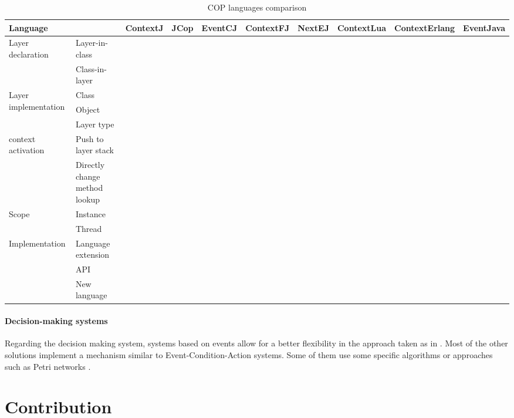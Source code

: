 \documentclass[a4paper]{article}
\begin{document}
\begin{landscape}
  \begin{table}
  \renewcommand{\arraystretch}{1.2}
  \begin{tabular}{l l c c c c c c c c }
  \hline
  \multicolumn{2}{l}{Language} & ContextJ & JCop & EventCJ & ContextFJ & NextEJ & ContextLua & ContextErlang & EventJava \\
  \hline
  \multirow{2}{*}{Layer declaration} & Layer-in-class & & & & & & & \\
    & Class-in-layer & & & & & & & \\
  \hline
  \multirow{3}{*}{Layer implementation} & Class & & & & & & & \\
    & Object & & & & & & & \\
    & Layer type & & & & & & & \\    
  \hline  
  \multirow{2}{*}{context activation} & Push to layer stack& & & & & & & \\
    & Directly change method lookup & & & & & & & \\
  \hline  
  \multirow{2}{*}{Scope} & Instance & & & & & & & \\
    & Thread & & & & & & & \\
  \hline
  \multirow{3}{*}{Implementation} & Language extension & & & & & & & & \\
    & API & & & & & & & & \\
    & New language & & & & & & & & \\
  \end{tabular}
  \caption{COP languages comparison}
  \end{table}
\end{landscape}


\paragraph{Decision-making systems}
Regarding the decision making system, systems based on events allow for a better flexibility in the approach taken as in \cite{kamina_eventcj:_2011} \cite{kamina_towards_2009}. Most of the other solutions implement a mechanism similar to Event-Condition-Action systems. Some of them use some specific algorithms \cite{jayaram_context-oriented_2009} or approaches such as Petri networks \cite{cardozo_uniting_2012}.

 
\section{Contribution}
\label{section:contribution}
\end{document}
